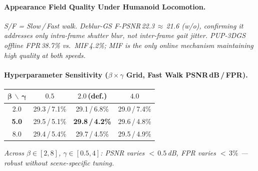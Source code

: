 \documentclass[conference]{IEEEtran}
\begin{document}
\paragraph{Appearance Field Quality Under Humanoid Locomotion.}
\vspace{-3pt}
\vspace{1pt}

{\scriptsize\itshape
S/F = Slow\,/\,Fast walk.
Deblur-GS F-PSNR\,22.3\,$\approx$\,21.6 (w/o), confirming it addresses only
\emph{intra}-frame shutter blur, not \emph{inter}-frame gait jitter.
PUP-3DGS offline FPR\,38.7\% vs.\ MIF\,4.2\%; MIF is the only
\emph{online} mechanism maintaining high quality at both speeds.}

\paragraph{Hyperparameter Sensitivity ($\beta\!\times\!\gamma$ Grid, Fast Walk
  PSNR\,dB\,/\,FPR).}
\vspace{-3pt}
\begin{center}\footnotesize
\setlength{\tabcolsep}{4pt}
\begin{tabular}{c|ccc}
\toprule
$\bm{\beta}\,\backslash\,\bm{\gamma}$ & $0.5$ & $2.0$\,(def.) & $4.0$\\
\midrule
2.0 & 29.3\,/\,7.1\% & 29.1\,/\,6.8\% & 29.0\,/\,7.4\%\\
\textbf{5.0} & 29.5\,/\,5.1\%
  & \textbf{29.8\,/\,4.2\%} & 29.6\,/\,4.8\%\\
8.0 & 29.4\,/\,5.4\% & 29.7\,/\,4.5\% & 29.5\,/\,4.9\%\\
\bottomrule
\end{tabular}
\end{center}
\vspace{1pt}
{\scriptsize\itshape
Across $\beta\!\in\![2,8]$, $\gamma\!\in\![0.5,4]$:
PSNR varies ${<}\,0.5$\,dB, FPR varies ${<}\,3\%$ —
robust without scene-specific tuning.}
\end{document}

